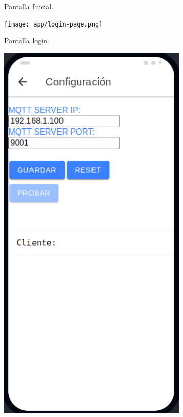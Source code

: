 \begin{figure}[!htpb]
\begin{subfigure}[b]{0.3\textwidth}
         \caption{Pantalla Inicial.}
         \label{fig_0:1_de_3}
     \end{subfigure}
     \hfill
     \begin{subfigure}[b]{0.3\textwidth}
         \centering
         \texttt{[image: app/login-page.png]}
         \caption{Pantalla login.}
         \label{fig_0:2_de_3}
     \end{subfigure}
     \hfill
     \begin{subfigure}[b]{0.3\textwidth}
         \centering
         \includegraphics[width=1.1\textwidth]{./Figures/app/system-config.png}

\end{subfigure}
\end{figure}
